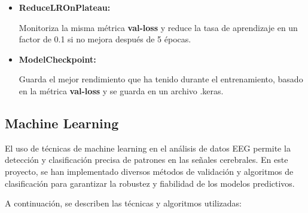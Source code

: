 \begin{itemize}
\begin{itemize}
\begin{itemize}
		\item
		\textbf{ReduceLROnPlateau:}	
	
	Monitoriza la misma métrica \textbf{val-loss} y reduce la tasa de aprendizaje en un factor de 0.1 si no mejora después de 5 épocas. 
	
		\item
		\textbf{ModelCheckpoint:}		
	
	Guarda el mejor rendimiento que ha tenido durante el entrenamiento, basado en la métrica \textbf{val-loss} y se guarda en un archivo .keras.
	

		\end{itemize}	
	
	\end{itemize}

\end{itemize}


\subsection{Machine Learning}

El uso de técnicas de machine learning en el análisis de datos EEG permite la detección y clasificación precisa de patrones en las señales cerebrales. En este proyecto, se han implementado diversos métodos de validación y algoritmos de clasificación para garantizar la robustez y fiabilidad de los modelos predictivos. 

A continuación, se describen las técnicas y algoritmos utilizadas:


